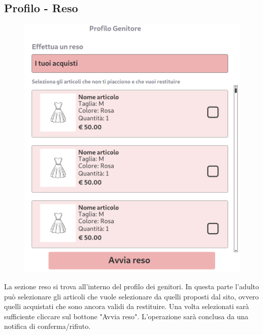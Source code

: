 \documentclass[12pt,a4paper]{report}
\begin{document}
\subsection{Profilo - Reso}
\begin{figure}
\includegraphics[height=0.45\textheight]{"Images Latex/Immagini Wireframe/Desktop/17 - Profilo Reso"}
\vspace{-80pt}
\end{figure}
 La sezione reso si trova all'interno del profilo dei genitori. In questa parte l'adulto può selezionare gli articoli che vuole selezionare da quelli proposti dal sito, ovvero quelli acquistati che sono ancora validi da restituire. Una volta selezionati sarà sufficiente cliccare sul bottone "Avvia reso". L'operazione sarà conclusa da una notifica di conferma/rifiuto.
 \vspace{40pt}
 \newpage
\end{document}
